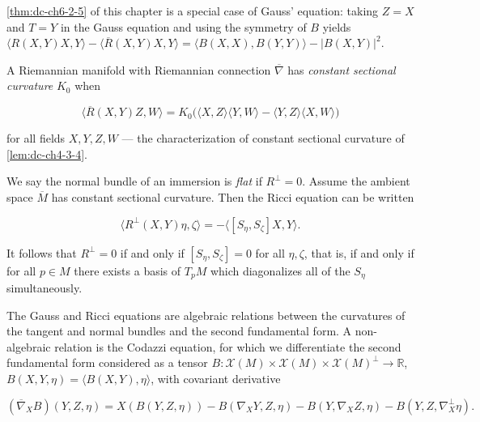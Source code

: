 \begin{remark}[Remark 3.2]
  \label{rem:dc-ch6-3-2}
  \leanok
  \cref{thm:dc-ch6-2-5} of this chapter is a special case of Gauss' equation:
  taking $Z=X$ and $T=Y$ in the Gauss equation and using the symmetry of $B$
  yields $\langle R(X,Y)X,Y\rangle-\langle\overline{R}(X,Y)X,Y\rangle
  =\langle B(X,X),B(Y,Y)\rangle-|B(X,Y)|^2$.
\end{remark}

\begin{definition}
  \label{def:dc-ch6-3-constant-curvature}
  \leanok
  A Riemannian manifold with Riemannian connection $\overline{\nabla}$ has
  \emph{constant sectional curvature} $K_0$ when

  $$
  \langle\overline{R}(X,Y)Z,W\rangle=K_0\big(\langle X,Z\rangle\langle Y,W\rangle-\langle Y,Z\rangle\langle X,W\rangle\big)
  $$

  for all fields $X,Y,Z,W$ — the characterization of constant sectional
  curvature of \cref{lem:dc-ch4-3-4}.
\end{definition}

\begin{remark}
  \label{rem:dc-ch6-3-3}
  \leanok
  We say the normal bundle of an immersion is \emph{flat} if $R^\perp=0$. Assume the
  ambient space $\overline{M}$ has constant sectional curvature. Then the Ricci
  equation can be written
  
  $$
  \langle R^\perp(X,Y)\eta,\zeta\rangle=-\langle[S_\eta,S_\zeta]X,Y\rangle.
  $$
  
  It follows that $R^\perp=0$ if and only if $[S_\eta,S_\zeta]=0$ for all
  $\eta,\zeta$, that is, if and only if for all $p\in M$ there exists a basis of
  $T_pM$ which diagonalizes all of the $S_\eta$ simultaneously.
  
  The Gauss and Ricci equations are algebraic relations between the curvatures of
  the tangent and normal bundles and the second fundamental form. A non-algebraic
  relation is the Codazzi equation, for which we differentiate the second
  fundamental form considered as a tensor
  $B:\mathcal{X}(M)\times\mathcal{X}(M)\times\mathcal{X}(M)^\perp\to\mathbb{R}$,
  $B(X,Y,\eta)=\langle B(X,Y),\eta\rangle$, with covariant derivative
  
  $$
  (\overline{\nabla}_X B)(Y,Z,\eta)=X(B(Y,Z,\eta))-B(\nabla_X Y,Z,\eta)-B(Y,\nabla_X Z,\eta)-B(Y,Z,\nabla_X^\perp\eta).
  $$
\end{remark}

